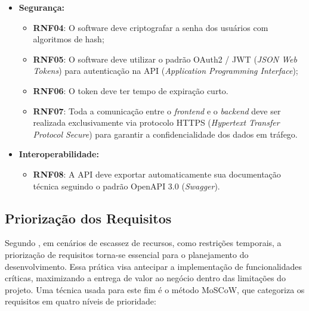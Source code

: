 \begin{itemize}

\item \textbf{Segurança:}

\begin{itemize}

\item \textbf{RNF04}: O software deve criptografar a senha dos usuários com algoritmos de hash;

\item \textbf{RNF05}: O software deve utilizar o padrão OAuth2 / JWT (\textit{JSON Web Tokens}) para autenticação na API (\textit{Application Programming Interface});

\item \textbf{RNF06}: O token deve ter tempo de expiração curto.

\item \textbf{RNF07}: Toda a comunicação entre o \textit{frontend} e o \textit{backend} deve ser realizada exclusivamente via protocolo HTTPS (\textit{Hypertext Transfer Protocol Secure}) para garantir a confidencialidade dos dados em tráfego.

\end{itemize}

\end{itemize}

\begin{itemize}

\item \textbf{Interoperabilidade:}

\begin{itemize}

\item \textbf{RNF08}: A API deve exportar automaticamente sua documentação técnica seguindo o padrão OpenAPI 3.0 (\textit{Swagger}).
\end{itemize}

\end{itemize}


\subsection[Priorização dos Requisitos]{Priorização dos Requisitos}
\label{priorizacao-requisitos}

Segundo , em cenários de escassez de recursos, como restrições temporais, a priorização de requisitos torna-se essencial para o planejamento do desenvolvimento. Essa prática visa antecipar a implementação de funcionalidades críticas, maximizando a entrega de valor ao negócio dentro das limitações do projeto. Uma técnica usada para este fim é o método MoSCoW, que categoriza os requisitos em quatro níveis de prioridade:

